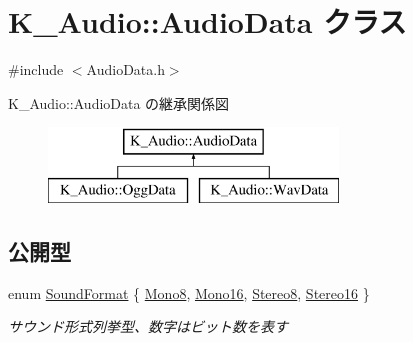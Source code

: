 \hypertarget{class_k___audio_1_1_audio_data}{}\section{K\+\_\+\+Audio\+:\+:Audio\+Data クラス}
\label{class_k___audio_1_1_audio_data}


{\ttfamily \#include $<$Audio\+Data.\+h$>$}

K\+\_\+\+Audio\+:\+:Audio\+Data の継承関係図\begin{figure}[H]
\begin{center}
\leavevmode
\includegraphics[height=2.000000cm]{class_k___audio_1_1_audio_data}
\end{center}
\end{figure}
\subsection*{公開型}
\begin{DoxyCompactItemize}
\item 
enum \mbox{\hyperlink{class_k___audio_1_1_audio_data_a7ef9acd4f7d2140951605d835cff2435}{Sound\+Format}} \{ \mbox{\hyperlink{class_k___audio_1_1_audio_data_a7ef9acd4f7d2140951605d835cff2435a9cfb443c5ead7e17f06e768eb2a9e915}{Mono8}}, 
\mbox{\hyperlink{class_k___audio_1_1_audio_data_a7ef9acd4f7d2140951605d835cff2435ad51581c07626d73329902c1587893768}{Mono16}}, 
\mbox{\hyperlink{class_k___audio_1_1_audio_data_a7ef9acd4f7d2140951605d835cff2435aecf057ba8d0fde7613a07aa0be0fcd3b}{Stereo8}}, 
\mbox{\hyperlink{class_k___audio_1_1_audio_data_a7ef9acd4f7d2140951605d835cff2435a4ebe72d0f83b3fc18973504a68c63f65}{Stereo16}}
 \}
\begin{DoxyCompactList}\small\item\em サウンド形式列挙型、数字はビット数を表す \end{DoxyCompactList}\end{DoxyCompactItemize}
